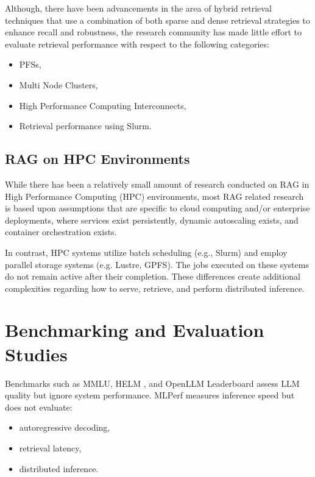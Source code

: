 Although, there have been advancements in the area of hybrid retrieval techniques that use a combination of both sparse and dense retrieval strategies to enhance recall and robustness, the research community has made little effort to evaluate retrieval performance with respect to the following categories: 

\begin{itemize}
    \item \acp{PFS},
    \item Multi Node Clusters,
    \item High Performance Computing Interconnects, 
    \item Retrieval performance using Slurm.
\end{itemize}

\subsection{RAG on HPC Environments}

While there has been a relatively small amount of research conducted on RAG in High Performance Computing (HPC) environments, most RAG related research is based upon assumptions that are specific to cloud computing and/or enterprise deployments, where services exist persistently, dynamic autoscaling exists, and container orchestration exists.

In contrast, \ac{HPC} systems utilize batch scheduling (e.g., Slurm) and employ parallel storage systems (e.g. Lustre, \ac{GPFS}). The jobs executed on these systems do not remain active after their completion. These differences create additional complexities regarding how to serve, retrieve, and perform distributed inference.

\section{Benchmarking and Evaluation Studies}

Benchmarks such as \ac{MMLU}, \ac{HELM} \cite{liang2022helm}, and OpenLLM Leaderboard assess \ac{LLM} quality but ignore system performance. \ac{MLPerf} \cite{reddi2020mlperf} measures inference speed but does not evaluate:

\begin{itemize}
    \item autoregressive decoding,
    \item retrieval latency,
    \item distributed inference.
\end{itemize}

